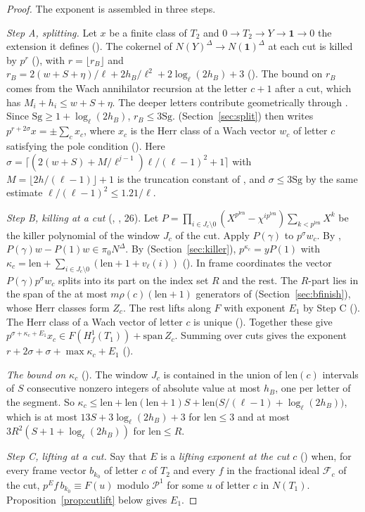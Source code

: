 \documentclass[11pt]{article}
\newcommand{\NN}{N^{\Delta}}
\newcommand{\Pp}{\mathcal P}
\newcommand{\Sg}{\mathrm{Sg}}
\theoremstyle{definition}
\theoremstyle{remark}
\begin{document}
\begin{proof}
The exponent is assembled in three steps.

\emph{Step A, splitting.} Let $x$ be a finite class of $T_2$ and $0\to T_2\to Y\to\mathbf 1\to0$ the extension it defines (). The cokernel of $N(Y)^\Delta\to N(\mathbf 1)^\Delta$ at each cut is killed by $p^r$ (), with $r=\lfloor r_B\rfloor$ and $r_B=2(w+S+\eta)/\ell+2h_B/\ell^2+2\log_\ell(2h_B)+3$ (). The bound on $r_B$ comes from the Wach annihilator recursion  at the letter $c+1$ after a cut, which has $M_i+h_i\le w+S+\eta$. The deeper letters contribute geometrically through . Since $\Sg\ge1+\log_\ell(2h_B)$, $r_B\le3\Sg$.  (Section~\ref{sec:split}) then writes $p^{r+2\sigma}x=\pm\sum_cx_c$, where $x_c$ is the Herr class of a Wach vector $w_c$ of letter $c$ satisfying the pole condition (). Here $\sigma=\lceil(2(w+S)+M/\ell^{j-1})\ell/(\ell-1)^2+1\rceil$ with $M=\lfloor 2h/(\ell-1)\rfloor+1$ is the truncation constant of , and $\sigma\le3\Sg$ by the same estimate $\ell/(\ell-1)^2\le1.21/\ell$.

\emph{Step B, killing at a cut} (, , 26). Let $P=\prod_{i\in J_c\setminus0}(X^{p^{\mathrm{len}}}-\chi^{ip^{\mathrm{len}}})\sum_{k<p^{\mathrm{len}}}X^k$ be the killer polynomial of the window $J_c$ of the cut. Apply $P(\gamma)$ to $p^\sigma w_c$. By , $P(\gamma)w-P(1)w\in\pi_0\NN$. By  (Section~\ref{sec:killer}), $p^{\kappa_c}=yP(1)$ with $\kappa_c=\mathrm{len}+\sum_{i\in J_c\setminus0}(\mathrm{len}+1+v_\ell(i))$ (). In frame coordinates the vector $P(\gamma)p^\sigma w_c$ splits into its part on the index set $R$ and the rest. The $R$-part lies in the span of the at most $m\rho(c)(\mathrm{len}+1)$ generators of  (Section~\ref{sec:bfinish}), whose Herr classes form $Z_c$. The rest lifts along $F$ with exponent $E_1$ by Step C (). The Herr class of a Wach vector of letter $c$ is unique (). Together these give $p^{\sigma+\kappa_c+E_1}x_c\in F(H^1_f(T_1))+\mathrm{span}\,Z_c$. Summing over cuts gives the exponent $r+2\sigma+\sigma+\max\kappa_c+E_1$ ().

\emph{The bound on $\kappa_c$} (). The window $J_c$ is contained in the union of $\mathrm{len}(c)$ intervals of $S$ consecutive nonzero integers of absolute value at most $h_B$, one per letter of the segment. So $\kappa_c\le\mathrm{len}+\mathrm{len}(\mathrm{len}+1)S+\mathrm{len}\bigl(S/(\ell-1)+\log_\ell(2h_B)\bigr)$, which is at most $13S+3\log_\ell(2h_B)+3$ for $\mathrm{len}\le3$ and at most $3R^2(S+1+\log_\ell(2h_B))$ for $\mathrm{len}\le R$.

\emph{Step C, lifting at a cut.} Say that $E$ is a \emph{lifting exponent at the cut} $c$ () when, for every frame vector $b_{k_0}$ of letter $c$ of $T_2$ and every $f$ in the fractional ideal $\mathcal F_c$ of the cut, $p^Ef\,b_{k_0}\equiv F(u)$ modulo $\Pp^1$ for some $u$ of letter $c$ in $N(T_1)$. Proposition~\ref{prop:cutlift} below gives $E_1$.
\end{proof}
\end{document}
